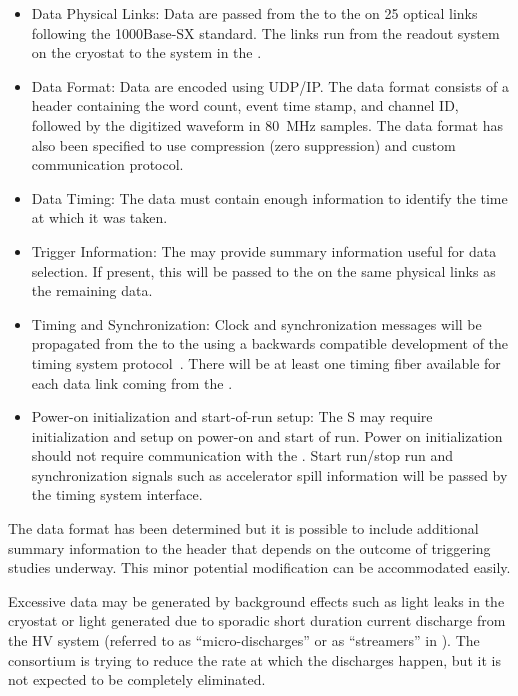 \begin{itemize}

\item Data Physical Links: Data are passed from the  to the  on 25 optical links following the 1000Base-SX standard. The links run from the  readout system on the cryostat to the  system in the .

\item Data Format: Data are encoded using UDP/IP.  The data format consists of a header containing the word count, event time stamp, and channel ID, followed by the digitized waveform in \SI{80}{MHz} samples.
The data format has also been specified to use compression (zero suppression) and custom communication protocol.

\item Data Timing: The data must contain enough information to identify the time at which it was taken.

\item Trigger Information: The  may provide summary information useful for data selection. If present, this will be passed to the  on the same physical links as the remaining data.

\item Timing and Synchronization: Clock and synchronization messages will be propagated from the  to the  using a backwards compatible development of the  timing system protocol~\cite{bib:docdb1651}. There will be at least one timing fiber available for each data link coming from the . 

\item Power-on initialization and start-of-run setup:  The S may require initialization and setup on power-on and start of run. Power on initialization should not require communication with the . Start run/stop run and synchronization signals such as accelerator spill information will be passed by the timing system interface.

\end{itemize}

The data format has been determined but it is possible to include additional summary information to the header that depends on the outcome of triggering studies underway. This minor potential modification can be accommodated easily.


Excessive  data may be generated by background effects such as light leaks in the cryostat or light generated due to sporadic short duration current discharge from the HV system (referred to as ``micro-discharges'' or as ``streamers'' in ).  The  consortium is trying to reduce the rate at which the discharges happen, but it is not expected to be completely eliminated. 

